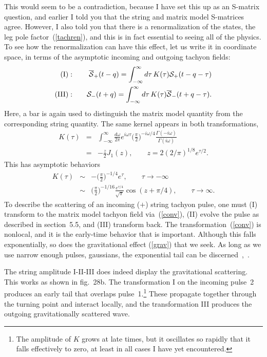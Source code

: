 This would seem to be a contradiction, because I have set this up
as an S-matrix question, and earlier I told you that the string and
matrix model S-matrices agree.  However, I also told you that there
is a renormalization of the states, the leg pole
factor~(\ref{tachren}), and this is
in fact essential to seeing all of the physics.  To see how the
renormalization can have this effect, let us write it in coordinate
space, in terms of the asymptotic incoming and outgoing tachyon
fields:
\begin{eqnarray}
{\rm (I)}:\quad &&
\overline {\cal S}_+(t - q) =
\int_{-\infty}^\infty d\tau\, K(\tau) {\cal S}_+(t - q - \tau)
\nonumber\\
{\rm (III)}:\quad &&
{\cal S}_-(t + q) = \int_{-\infty}^\infty d\tau\, K(\tau) \overline
{\cal S}_-(t + q - \tau).  \label{conv}
\end{eqnarray}
Here, a bar is again used to distinguish the matrix model quantity
from the corresponding string quantity.  The same kernel appears in
both transformations,
\begin{eqnarray}
K(\tau) &=& \int_{-\infty}^\infty \frac{d\omega}{2\pi}
e^{i \omega \tau}
\biggl( \frac{\pi}{2} \biggr)^{-i\omega/4}
\frac{\Gamma(-i \omega )}{\Gamma(i \omega )}
\nonumber\\
&=& -\frac{z}{2} J_1 (z), \qquad z = 2 (2/\pi)^{1/8} e^{\tau/2}.
\end{eqnarray}
This has asymptotic behaviors
\begin{eqnarray}
K(\tau) &\sim&
-\biggl( \frac{\pi}{2} \biggr)^{-1/4} e^{\tau}, \qquad \tau \to
-\infty \nonumber\\
&\sim& \biggl( \frac{\pi}{2} \biggr)^{-1/16}
\frac{e^{\tau/4}}{\sqrt{\pi}}
\cos( z + \pi/4 ), \qquad \tau \to \infty . \label{kasym}
\end{eqnarray}
To describe the scattering of an incoming ($+$) string tachyon
pulse, one must (I) transform to the matrix model tachyon field
via~(\ref{conv}), (II) evolve the
pulse as described in section~5.5, and (III) transform back.
The transformation~(\ref{conv}) is nonlocal, and it is the 
early-time behavior that is important.  Although this falls
exponentially, so does the gravitational effect (\ref{grav}) that we
seek.  As long as we use narrow enough pulses, gaussians, the
exponential tail can be discerned~\cite{Nzm},~\cite{NP}.

The string amplitude I-II-III does
indeed display the gravitational scattering.  This works as shown in
fig.~28b.  The transformation I on the incoming pulse~2 produces an
early tail that overlaps pulse~1.\footnote
{The amplitude of $K$ grows at late times, but it oscillates so
rapidly that it falls effectively to zero, at least in all cases I
have yet encountered.}
These propagate together through
the turning point and interact locally, and the transformation III
produces the outgoing gravitationally scattered wave.

